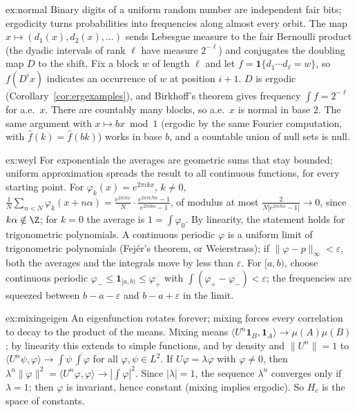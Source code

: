 \begin{solution}{ex:normal}
\idea Binary digits of a uniform random number are independent fair bits; ergodicity turns probabilities into frequencies along almost every orbit.
\writeup The map $x\mapsto(d_1(x),d_2(x),\dots)$ sends Lebesgue measure to the fair Bernoulli product (the dyadic intervals of rank $\ell$ have measure $2^{-\ell}$) and conjugates the doubling map $D$ to the shift. Fix a block $w$ of length $\ell$ and let
$f=\mathbf 1\{d_1\cdots d_\ell=w\}$, so $f(D^ix)$ indicates an occurrence of $w$ at position $i+1$. $D$ is ergodic (Corollary~\ref{cor:ergexamples}), and Birkhoff's theorem gives frequency $\int f=2^{-\ell}$ for a.e.\ $x$. There are countably many blocks, so a.e.\ $x$
is normal in base $2$. The same argument with $x\mapsto bx\bmod1$ (ergodic by the same Fourier computation, with $\hat f(k)=\hat f(bk)$) works in base $b$, and a countable union of null sets is null.
\end{solution}

\begin{solution}{ex:weyl}
\idea For exponentials the averages are geometric sums that stay bounded; uniform approximation spreads the result to all continuous functions, for every starting point.
\writeup For $\varphi_k(x)=e^{2\pi ikx}$, $k\neq0$, $\frac1N\sum_{n<N}\varphi_k(x+n\alpha)=\frac{e^{2\pi ikx}}N\cdot\frac{e^{2\pi ikN\alpha}-1}{e^{2\pi ik\alpha}-1}$, of modulus at most $\frac2{N|e^{2\pi ik\alpha}-1|}\to0$, since $k\alpha\notin\Z$; for $k=0$ the average is $1=\int\varphi_0$. By linearity, the
statement holds for trigonometric polynomials. A continuous periodic $\varphi$ is a uniform limit of trigonometric polynomials (Fej\'er's theorem, or Weierstrass); if $\|\varphi-p\|_\infty<\varepsilon$, both the averages and the integrals move by less than $\varepsilon$.
For $[a,b)$, choose continuous periodic $\varphi_-\le\mathbf 1_{[a,b)}\le\varphi_+$ with $\int(\varphi_+-\varphi_-)<\varepsilon$; the frequencies are squeezed between $b-a-\varepsilon$ and $b-a+\varepsilon$ in the limit.
\end{solution}

\begin{solution}{ex:mixingeigen}
\idea An eigenfunction rotates forever; mixing forces every correlation to decay to the product of the means.
\writeup Mixing means $\langle U^n\mathbf 1_B,\mathbf 1_A\rangle\to\mu(A)\mu(B)$; by linearity this extends to simple functions, and by density and $\|U^n\|=1$ to $\langle U^n\psi,\varphi\rangle\to\int\psi\,\overline{\int\varphi}$ for all $\varphi,\psi\in L^2$. If $U\varphi=\lambda\varphi$
with $\varphi\neq0$, then $\lambda^n\|\varphi\|^2=\langle U^n\varphi,\varphi\rangle\to|\int\varphi|^2$. Since $|\lambda|=1$, the sequence $\lambda^n$ converges only if $\lambda=1$; then $\varphi$ is invariant, hence constant (mixing implies ergodic). So $H_c$ is the space of constants.
\end{solution}

